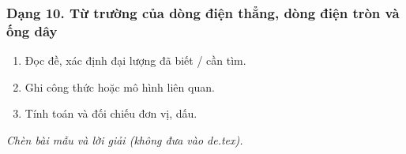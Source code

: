 \subsubsection{Dạng 10. Từ trường của dòng điện thẳng, dòng điện tròn và ống dây}
\begin{phuongphap}
\begin{enumerate}
\item Đọc đề, xác định đại lượng đã biết / cần tìm.
\item Ghi công thức hoặc mô hình liên quan.
\item Tính toán và đối chiếu đơn vị, dấu.
\end{enumerate}
\end{phuongphap}
\begin{vidumau}
\textit{Chèn bài mẫu và lời giải (không đưa vào de.tex).}
\end{vidumau}

